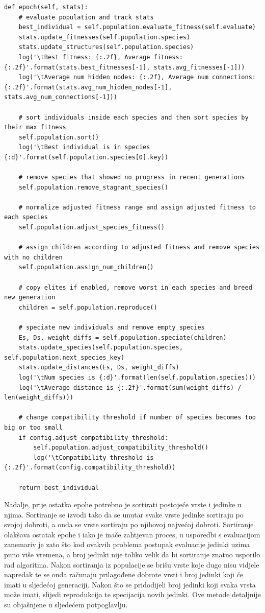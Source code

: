 \documentclass[times, utf8, diplomski, numeric]{fer}
\begin{document}
\begin{lstlisting}[frame=single, label=kod1, caption=Izvorni tekst metode \textit{epoch} u klasi \textit{NEAT}]
def epoch(self, stats):
	# evaluate population and track stats
	best_individual = self.population.evaluate_fitness(self.evaluate)
	stats.update_fitnesses(self.population.species)
	stats.update_structures(self.population.species)
	log('\tBest fitness: {:.2f}, Average fitness: {:.2f}'.format(stats.best_fitnesses[-1], stats.avg_fitnesses[-1]))
	log('\tAverage num hidden nodes: {:.2f}, Average num connections: {:.2f}'.format(stats.avg_num_hidden_nodes[-1], stats.avg_num_connections[-1]))

	# sort individuals inside each species and then sort species by their max fitness
	self.population.sort()
	log('\tBest individual is in species {:d}'.format(self.population.species[0].key))

	# remove species that showed no progress in recent generations
	self.population.remove_stagnant_species()

	# normalize adjusted fitness range and assign adjusted fitness to each species
	self.population.adjust_species_fitness()

	# assign children according to adjusted fitness and remove species with no children
	self.population.assign_num_children()

	# copy elites if enabled, remove worst in each species and breed new generation
	children = self.population.reproduce()

	# speciate new individuals and remove empty species
	Es, Ds, weight_diffs = self.population.speciate(children)
	stats.update_species(self.population.species, self.population.next_species_key)
	stats.update_distances(Es, Ds, weight_diffs)
	log('\tNum species is {:d}'.format(len(self.population.species)))
	log('\tAverage distance is {:.2f}'.format(sum(weight_diffs) / len(weight_diffs)))

	# change compatibility threshold if number of species becomes too big or too small
	if config.adjust_compatibility_threshold:
		self.population.adjust_compatibility_threshold()
		log('\tCompatibility threshold is {:.2f}'.format(config.compatibility_threshold))

	return best_individual
\end{lstlisting}

Nadalje, prije ostatka epohe potrebno je sortirati postojeće vrste i jedinke u njima. Sortiranje se izvodi tako da se unutar svake vrste jedinke sortiraju po svojoj dobroti, a onda se vrste sortiraju po njihovoj najvećoj dobroti. Sortiranje olakšava ostatak epohe i iako je inače zahtjevan proces, u usporedbi s evaluacijom zanemariv je zato što kod ovakvih problema postupak evaluacije jedinki uzima puno više vremena, a broj jedinki nije toliko velik da bi sortiranje znatno usporilo rad algoritma. Nakon sortiranja iz populacije se brišu vrste koje dugo nisu vidjele napredak te se onda računaju prilagođene dobrote vrsti i broj jedinki koji će imati u sljedećoj generaciji. Nakon što se pridodijeli broj jedinki koji svaka vrsta može imati, slijedi reprodukcija te specijacija novih jedinki. Ove metode detaljnije su objašnjene u sljedećem potpoglavlju.
\end{document}
